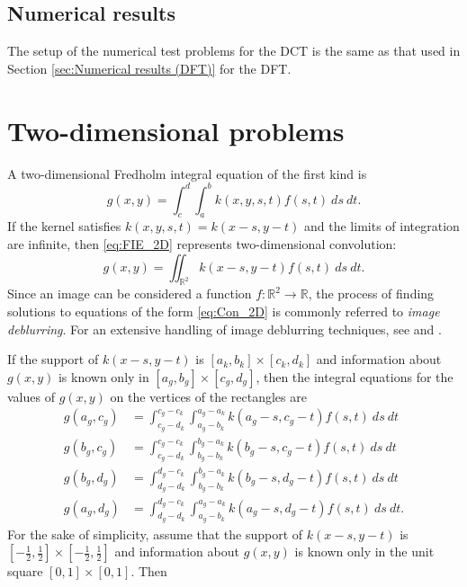 \documentclass[12pt,notitlepage]{report}
\begin{document}
\section{Numerical results} \label{sec:Numerical results (DCT)}
The setup of the numerical test problems for the DCT is the same as that used in Section \ref{sec:Numerical results (DFT)} for the DFT.

\chapter{Two-dimensional problems} \label{ch:2D problems}

A two-dimensional Fredholm integral equation of the first kind is
\begin{equation}
g(x,y) = \int_c^d \int_a^b k(x,y,s,t)f(s,t)~ds~dt.
\label{eq:FIE_2D}
\end{equation}
If the kernel satisfies $k(x,y,s,t) = k(x-s,y-t)$ and the limits of integration are infinite, then \eqref{eq:FIE_2D} represents two-dimensional convolution:
\begin{equation}
g(x,y) = \iint_{\mathbb{R}^2} k(x-s,y-t)f(s,t)~ds~dt.
\label{eq:Con_2D}
\end{equation}
Since an image can be considered a function $f : \mathbb{R}^2 \rightarrow \mathbb{R}$, the process of finding solutions to equations of the form \eqref{eq:Con_2D} is commonly referred to \textit{image deblurring}. For an extensive handling of image deblurring techniques, see \cite{HansenNagyOLeary} and \cite[Ch.~5]{Vogel:2002}. \par
If the support of $k(x-s,y-t)$ is $[a_k,b_k] \times [c_k,d_k]$ and information about $g(x,y)$ is known only in $[a_g,b_g] \times [c_g,d_g]$, then the integral equations for the values of $g(x,y)$ on the vertices of the rectangles are
\begin{align*}
g(a_g,c_g) &= \int_{c_g-d_k}^{c_g-c_k} \int_{a_g-b_k}^{a_g-a_k} k(a_g-s,c_g-t)f(s,t)~ds~dt \\
g(b_g,c_g) &= \int_{c_g-d_k}^{c_g-c_k} \int_{b_g-b_k}^{b_g-a_k} k(b_g-s,c_g-t)f(s,t)~ds~dt \\
g(b_g,d_g) &= \int_{d_g-d_k}^{d_g-c_k} \int_{b_g-b_k}^{b_g-a_k} k(b_g-s,d_g-t)f(s,t)~ds~dt \\
g(a_g,d_g) &= \int_{d_g-d_k}^{d_g-c_k} \int_{a_g-b_k}^{a_g-a_k} k(a_g-s,d_g-t)f(s,t)~ds~dt.
\end{align*}
For the sake of simplicity, assume that the support of $k(x-s,y-t)$ is $[-\frac{1}{2},\frac{1}{2}] \times [-\frac{1}{2},\frac{1}{2}]$ and information about $g(x,y)$ is known only in the unit square $[0,1] \times [0,1]$. Then
\end{document}
